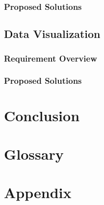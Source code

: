 \documentclass[letterpaper,10pt]{article}
\begin{document}
\subsubsection{Proposed Solutions}

\subsection{Data Visualization}
\subsubsection{Requirement Overview}
\subsubsection{Proposed Solutions}

\section{Conclusion}
\section{Glossary}

\section{Appendix}

\end{document}
